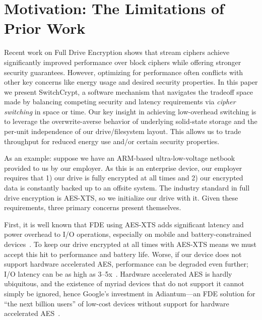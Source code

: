 



\title{\TITLE}

\date{}
\maketitle

\thispagestyle{empty}

\section{Motivation: The Limitations of Prior Work}
\label{sec:motivation}

Recent work on Full Drive Encryption shows that stream ciphers achieve
significantly improved performance over block ciphers while offering stronger
security guarantees. However, optimizing for performance often conflicts with
other key concerns like energy usage and desired security properties. In this
paper we present SwitchCrypt, a software mechanism that navigates the tradeoff
space made by balancing competing security and latency requirements via
\emph{cipher switching} in space or time. Our key insight in achieving
low-overhead switching is to leverage the overwrite-averse behavior of
underlying solid-state storage and the per-unit independence of our
drive/filesystem layout. This allows us to trade throughput for reduced energy
use and/or certain security properties.

As an example: suppose we have an ARM-based ultra-low-voltage netbook provided
to us by our employer. As this is an enterprise device, our employer requires
that 1) our drive is fully encrypted at all times and 2) our encrypted data is
constantly backed up to an offsite system. The industry standard in full drive
encryption is AES-XTS, so we initialize our drive with it. Given these
requirements, three primary concerns present themselves.

First, it is well known that FDE using AES-XTS adds significant latency and
power overhead to I/O operations, especially on mobile and battery-constrained
devices~\cite{google-engadget, android-M-mobile-motivation,
android-M-mobile-motivation-2}. To keep our drive encrypted at all times with
AES-XTS means we must accept this hit to performance and battery life. Worse, if
our device does not support hardware accelerated AES, performance can be
degraded even further; I/O latency can be as high as 3--5x~\cite{StrongBox}.
Hardware accelerated AES is hardly ubiquitous, and the existence of myriad
devices that do not support it cannot simply be ignored, hence Google's
investment in Adiantum---an FDE solution for ``the next billion users'' of
low-cost devices without support for hardware accelerated AES~\cite{Adiantum}.

